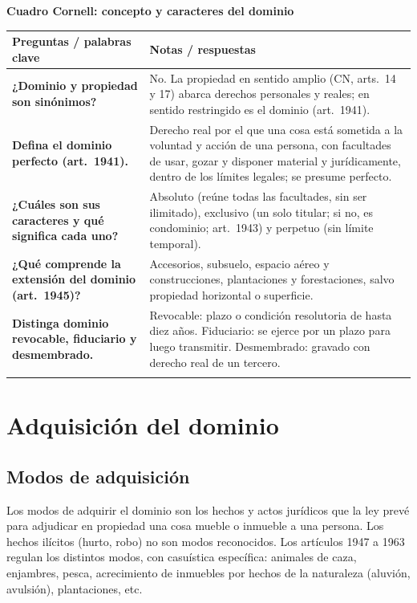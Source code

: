 \documentclass[12pt,oneside]{book}
\renewcommand{\arraystretch}{1.25}
\newcommand{\cq}[2]{\textbf{#1} & #2 \\[0.45em]}
\newcommand{\cornell}[3]{%
\par\bigskip\noindent\textbf{\large Cuadro Cornell: #1}\par\smallskip
\begin{center}
\small
\renewcommand{\arraystretch}{1.15}
\begin{tabularx}{\textwidth}{>{\raggedright\arraybackslash}p{0.27\textwidth}>{\raggedright\arraybackslash}X}
\toprule
\textbf{Preguntas / palabras clave} & \textbf{Notas / respuestas} \\
\midrule
#2
\midrule
\multicolumn{2}{p{\dimexpr\textwidth-2\tabcolsep\relax}}{\textbf{Resumen.} #3} \\
\bottomrule
\end{tabularx}
\end{center}
}
\begin{document}
\cornell{concepto y caracteres del dominio}{
\cq{¿Dominio y propiedad son sinónimos?}{No. La propiedad en sentido amplio (CN, arts.~14 y 17) abarca derechos personales y reales; en sentido restringido es el dominio (art.~1941).}
\cq{Defina el dominio perfecto (art.~1941).}{Derecho real por el que una cosa está sometida a la voluntad y acción de una persona, con facultades de usar, gozar y disponer material y jurídicamente, dentro de los límites legales; se presume perfecto.}
\cq{¿Cuáles son sus caracteres y qué significa cada uno?}{Absoluto (reúne todas las facultades, sin ser ilimitado), exclusivo (un solo titular; si no, es condominio; art.~1943) y perpetuo (sin límite temporal).}
\cq{¿Qué comprende la extensión del dominio (art.~1945)?}{Accesorios, subsuelo, espacio aéreo y construcciones, plantaciones y forestaciones, salvo propiedad horizontal o superficie.}
\cq{Distinga dominio revocable, fiduciario y desmembrado.}{Revocable: plazo o condición resolutoria de hasta diez años. Fiduciario: se ejerce por un plazo para luego transmitir. Desmembrado: gravado con derecho real de un tercero.}
}{El dominio es el derecho real más extenso, que reúne las facultades de usar, gozar y disponer; es absoluto, exclusivo y perpetuo, se extiende a accesorios, subsuelo, espacio aéreo y lo construido, y se clasifica en perfecto y tres tipos de imperfecto.}

\chapter[Adquisición del dominio]{Adquisición del dominio}\label{cap:adq-dominio}

\section{Modos de adquisición}

Los modos de adquirir el dominio son los hechos y actos jurídicos que la ley prevé para adjudicar en propiedad una cosa mueble o inmueble a una persona. Los hechos ilícitos (hurto, robo) no son modos reconocidos. Los artículos 1947 a 1963 regulan los distintos modos, con casuística específica: animales de caza, enjambres, pesca, acrecimiento de inmuebles por hechos de la naturaleza (aluvión, avulsión), plantaciones, etc.
\end{document}
